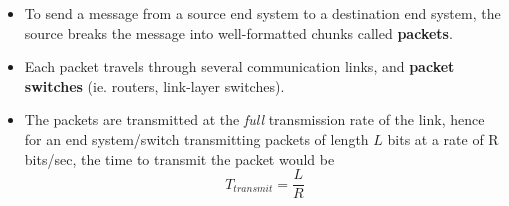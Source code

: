 \documentclass{article}
\theoremstyle{plain}
\theoremstyle{definition}
\begin{document}
\begin{itemize}
    \item To send a message from a source end system to a destination end system, the source breaks the message into well-formatted chunks called \textbf{packets}. 
    
    \item Each packet travels through several communication links, and \textbf{packet switches} (ie. routers, link-layer switches).
    
    \item The packets are transmitted at the \textit{full} transmission rate of the link, hence for an end system/switch transmitting packets of length $L$ bits at a rate of R bits/sec, the time to transmit the packet would be 
    \begin{equation}
        T_{transmit} = \frac{L}{R}
    \end{equation}
\end{itemize}
    
\end{document}
